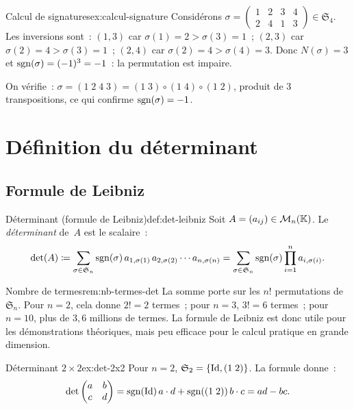 \begin{example}{Calcul de signatures}{ex:calcul-signature}
  Considérons $\sigma=\begin{pmatrix}1&2&3&4\\2&4&1&3\end{pmatrix}
  \in\mathfrak{S}_4$. Les inversions sont~:
  $(1,3)$ car $\sigma(1)=2>\sigma(3)=1$~;
  $(2,3)$ car $\sigma(2)=4>\sigma(3)=1$~;
  $(2,4)$ car $\sigma(2)=4>\sigma(4)=3$.
  Donc $N(\sigma)=3$ et $\operatorname{sgn}(\sigma)=(-1)^3=-1$~: la permutation est
  impaire.

  \medskip

  On vérifie~: $\sigma=(1\;2\;4\;3)=(1\;3)\circ(1\;4)\circ(1\;2)$,
  produit de $3$ transpositions, ce qui confirme $\operatorname{sgn}(\sigma)=-1$.
\end{example}

\section{Définition du déterminant}\label{sec:def-determinant}

\subsection{Formule de Leibniz}\label{subsec:leibniz}

\begin{definition}{Déterminant (formule de Leibniz)}{def:det-leibniz}
  Soit $A=(a_{ij})\in\mathcal{M}_n({\mathbb{K}})$. Le \emph{déterminant}
  de~$A$ est le scalaire~:
  \[
    \det(A)\coloneqq\sum_{\sigma\in\mathfrak{S}_n}\operatorname{sgn}(\sigma)\,
    a_{1,\sigma(1)}\,a_{2,\sigma(2)}\cdots a_{n,\sigma(n)}
    =\sum_{\sigma\in\mathfrak{S}_n}\operatorname{sgn}(\sigma)\prod_{i=1}^{n}
    a_{i,\sigma(i)}.
  \]
\end{definition}

\begin{remark}{Nombre de termes}{rem:nb-termes-det}
  La somme porte sur les $n!$ permutations de $\mathfrak{S}_n$. Pour
  $n=2$, cela donne $2!=2$ termes~; pour $n=3$, $3!=6$ termes~; pour
  $n=10$, plus de $3{,}6$ millions de termes. La formule de Leibniz est
  donc utile pour les démonstrations théoriques, mais peu efficace pour
  le calcul pratique en grande dimension.
\end{remark}

\begin{example}{Déterminant $2\times 2$}{ex:det-2x2}
  Pour $n=2$, $\mathfrak{S}_2=\left\{\operatorname{Id},(1\;2)\right\}$. La formule donne~:
  \[
    \det\begin{pmatrix}a&b\\c&d\end{pmatrix}
    =\operatorname{sgn}(\operatorname{Id})\,a\cdot d+\operatorname{sgn}((1\;2))\,b\cdot c=ad-bc.
  \]
\end{example}

